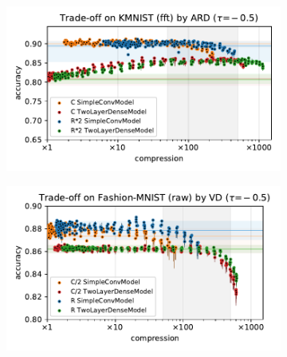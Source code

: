 \documentclass{beamer}
\begin{document}
\begin{frame}
\begin{figure}[t]
\begin{subfigure}[b]{0.5\columnwidth}
      \centering
      \includegraphics[width=\linewidth]{figure__mnist-like__trade-off/appendix__cmp__ARD__kmnist__fft__-0.5.pdf}
    \end{subfigure}\hspace{-1em}%
    \begin{subfigure}[b]{0.5\columnwidth}
      \centering
      \includegraphics[width=\linewidth]{figure__mnist-like__trade-off/appendix__cmp__VD__fashionmnist__raw__-0.5.pdf}
    \end{subfigure}%
  \end{figure}

\end{frame}
\end{document}
